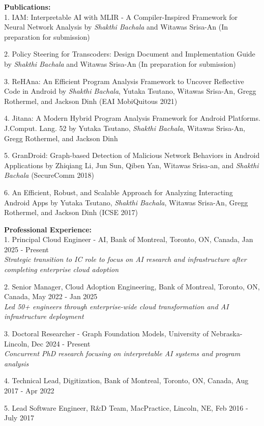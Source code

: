 \documentclass[10pt,letterpaper]{article}
\begin{document}
\textbf{Publications:} \\
1. IAM: Interpretable AI with MLIR - A Compiler-Inspired Framework for Neural Network Analysis by \textit{Shakthi Bachala} and Witawas Srisa-An (In preparation for submission)

2. Policy Steering for Transcoders: Design Document and Implementation Guide by \textit{Shakthi Bachala} and Witawas Srisa-An (In preparation for submission)

3. ReHAna: An Efficient Program Analysis Framework to Uncover Reflective Code in Android by \textit{Shakthi Bachala}, Yutaka Tsutano, Witawas Srisa-An, Gregg Rothermel, and Jackson Dinh (EAI MobiQuitous 2021)

4. Jitana: A Modern Hybrid Program Analysis Framework for Android Platforms. J.Comput. Lang. 52 by Yutaka Tsutano, \textit{Shakthi Bachala}, Witawas Srisa-An, Gregg Rothermel, and Jackson Dinh

5. GranDroid: Graph-based Detection of Malicious Network Behaviors in Android Applications by Zhiqiang Li, Jun Sun, Qiben Yan, Witawas Srisa-an, and \textit{Shakthi Bachala} (SecureComm 2018)

6. An Efficient, Robust, and Scalable Approach for Analyzing Interacting Android Apps by Yutaka Tsutano, \textit{Shakthi Bachala}, Witawas Srisa-An, Gregg Rothermel, and Jackson Dinh (ICSE 2017)

\textbf{Professional Experience:} \\
1. Principal Cloud Engineer - AI, Bank of Montreal, Toronto, ON, Canada, Jan 2025 - Present \\
\textit{Strategic transition to IC role to focus on AI research and infrastructure after completing enterprise cloud adoption}

2. Senior Manager, Cloud Adoption Engineering, Bank of Montreal, Toronto, ON, Canada, May 2022 - Jan 2025 \\
\textit{Led 50+ engineers through enterprise-wide cloud transformation and AI infrastructure deployment}

3. Doctoral Researcher - Graph Foundation Models, University of Nebraska-Lincoln, Dec 2024 - Present \\
\textit{Concurrent PhD research focusing on interpretable AI systems and program analysis}

4. Technical Lead, Digitization, Bank of Montreal, Toronto, ON, Canada, Aug 2017 - Apr 2022

5. Lead Software Engineer, R\&D Team, MacPractice, Lincoln, NE, Feb 2016 - July 2017
\end{document}
